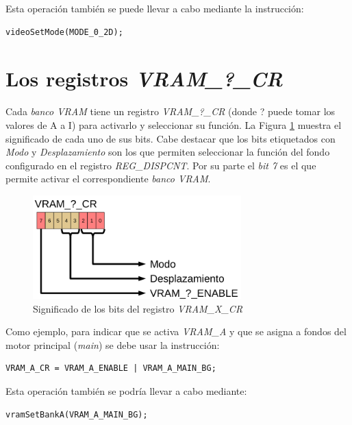 Esta operación también se puede llevar a cabo mediante la instrucción:
\begin{verbatim}
videoSetMode(MODE_0_2D);
\end{verbatim}

\section{Los registros \textit{VRAM\_?\_CR}} 
Cada \textit{banco VRAM} tiene un registro \textit{VRAM\_?\_CR} (donde ? puede tomar los valores de A a I) para activarlo y seleccionar su función. La Figura \ref{fig_c5_reg_vram1} muestra el significado de cada uno de sus bits. Cabe destacar que los bits etiquetados con \textit{Modo} y \textit{Desplazamiento} son los que permiten seleccionar la función del fondo configurado en el registro \textit{REG\_DISPCNT}. Por su parte el \textit{bit 7} es el que permite activar el correspondiente \textit{banco VRAM}.

\begin{figure}[t]
\centering
\includegraphics[height=4cm]{Figuras/C5/c5_reg_vram1.png}
\caption{Significado de los bits del registro \textit{VRAM\_X\_CR}}
\label{fig_c5_reg_vram1}
\end{figure}

Como ejemplo, para indicar que se activa \textit{VRAM\_A} y que se asigna a fondos del motor principal (\textit{main}) se debe usar la instrucción:

\begin{verbatim}
VRAM_A_CR = VRAM_A_ENABLE | VRAM_A_MAIN_BG;
\end{verbatim}

Esta operación también se podría llevar a cabo mediante:

\begin{verbatim}
vramSetBankA(VRAM_A_MAIN_BG);
\end{verbatim}

